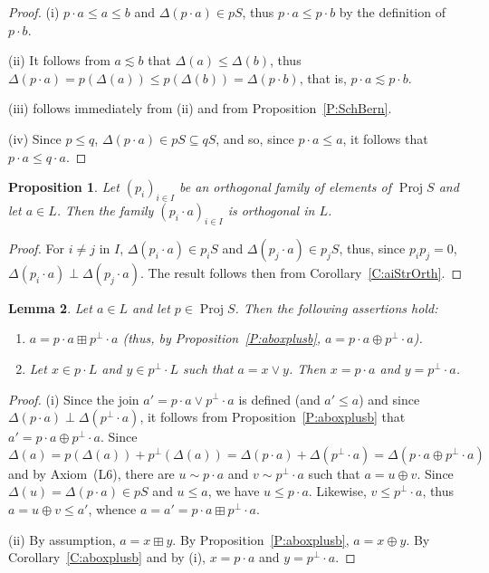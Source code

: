\documentclass[psamsfonts,reqno]{memo-l}
\theoremstyle{plain}
\newtheorem{lemma}{Lemma}[section]
\newtheorem{proposition}[lemma]{Proposition}
\theoremstyle{definition}
\theoremstyle{remark}
\numberwithin{equation}{section}
\newcommand{\pup}[1]{\textup{(}{#1}\textup{)}}
\DeclareMathOperator{\BB}{Proj}
\newcommand{\DD}{\Delta}
\newcommand{\famm}[2]{(#1)_{#2}}
\begin{document}
\begin{proof}
(i) $p\cdot a\leq a\leq b$ and $\DD(p\cdot a)\in pS$, thus
$p\cdot a\leq p\cdot b$ by the definition of~$p\cdot b$.

(ii) It follows from $a\lesssim b$ that $\DD(a)\leq\DD(b)$, thus
$\DD(p\cdot a)=p(\DD(a))\leq p(\DD(b))=\DD(p\cdot b)$, that is,
$p\cdot a\lesssim p\cdot b$.

(iii) follows immediately from (ii) and from Proposition~\ref{P:SchBern}.

(iv) Since $p\leq q$, $\DD(p\cdot a)\in pS\subseteq qS$, and so, since
$p\cdot a\leq a$, it follows that $p\cdot a\leq q\cdot a$.
\end{proof}

\begin{proposition}\label{P:piaOrth}
Let $\famm{p_i}{i\in I}$ be an orthogonal family of elements
of\index{pzzroj@$\BB{S}$}
$\BB{S}$ and let $a\in L$. Then the family $\famm{p_i\cdot a}{i\in I}$ is
orthogonal in $L$.
\end{proposition}

\begin{proof}
For $i\neq j$ in $I$, $\DD(p_i\cdot a)\in p_iS$ and
$\DD(p_j\cdot a)\in p_jS$, thus, since $p_ip_j=0$,
$\DD(p_i\cdot a)\perp\DD(p_j\cdot a)$. The result follows then from
Corollary~\ref{C:aiStrOrth}.
\end{proof}

\begin{lemma}\label{L:ppbotonL}
Let $a\in L$ and let \index{pzzroj@$\BB{S}$}$p\in\BB{S}$. Then the following
assertions hold:
\begin{enumerate}
\item $a=p\cdot a\boxplus p^\bot\cdot a$
\pup{thus, by Proposition~\textup{\ref{P:aboxplusb}},
$a=p\cdot a\oplus p^\bot\cdot a$}.

\item Let $x\in p\cdot L$ and $y\in p^\bot\cdot L$ such that $a=x\vee y$. Then
$x=p\cdot a$ and $y=p^\bot\cdot a$.
\end{enumerate}

\end{lemma}

\begin{proof}
(i) Since the join $a'=p\cdot a\vee p^\bot\cdot a$ is defined
(and $a'\leq a$) and since $\DD(p\cdot a)\perp\DD(p^\bot\cdot a)$, it
follows from Proposition~\ref{P:aboxplusb} that
$a'=p\cdot a\oplus p^\bot\cdot a$. Since
   \[
   \DD(a)=p(\DD(a))+p^\bot(\DD(a))=\DD(p\cdot a)+\DD(p^\bot\cdot a)
   =\DD(p\cdot a\oplus p^\bot\cdot a)
   \]
and by Axiom~(L6), there are $u\sim p\cdot a$ and
$v\sim p^\bot\cdot a$ such that $a=u\oplus v$. Since
$\DD(u)=\DD(p\cdot a)\in pS$ and $u\leq a$, we have $u\leq p\cdot a$.
Likewise, $v\leq p^\bot\cdot a$, thus $a=u\oplus v\leq a'$, whence
$a=a'=p\cdot a\boxplus p^\bot\cdot a$.

(ii) By assumption, $a=x\boxplus y$. By Proposition~\ref{P:aboxplusb},
$a=x\oplus y$. By Corollary~\ref{C:aboxplusb} and by (i), $x=p\cdot a$ and
$y=p^\bot\cdot a$.
\end{proof}
\end{document}
